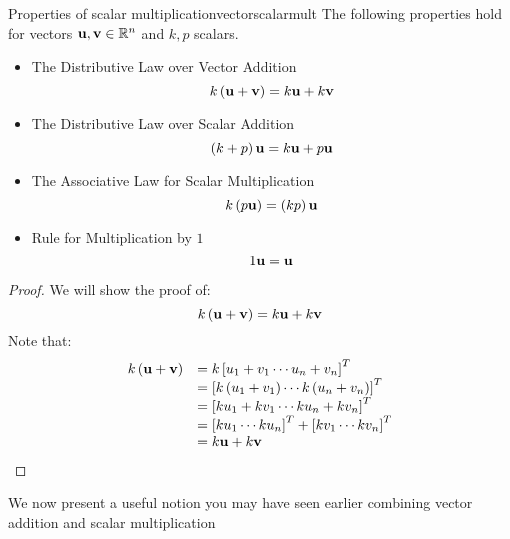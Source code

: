 \begin{theorem}{Properties of scalar multiplication}{vectorscalarmult}
The following properties hold for vectors ${\bf u},{\bf v}\in \mathbb{R}^{n}$ and $k,p $
scalars.
\begin{itemize}
\item The Distributive Law over Vector Addition
\begin{equation*}
k \left( {\bf u}+{\bf v}\right) = k{\bf u}+ k{\bf v}
\end{equation*}
\item The Distributive Law over Scalar Addition
\begin{equation*}
\left( k + p  \right){\bf u} = k {\bf u}+p {\bf u}
\end{equation*}
\item The Associative Law for Scalar Multiplication
\begin{equation*}
k \left( p {\bf u}\right) = \left(k p \right){\bf u}
\end{equation*}
\item Rule for Multiplication by $1$
\begin{equation*}
1{\bf u}={\bf u}  
\end{equation*}
\end{itemize}
\end{theorem}

\begin{proof}
We will show the proof of: 
\begin{equation*}
k \left( {\bf u}+{\bf v}\right) = k {\bf u}+ k {\bf v}
\end{equation*}
Note that:
\begin{equation*}
\begin{array}{ll}
k \left( {\bf u}+{\bf v}\right) & =k \left[ u_{1}+v_{1} \cdots u_{n}+v_{n}\right]^T \\
& = \left[ k \left( u_{1}+v_{1}\right) \cdots k \left( u_{n}+v_{n}\right) \right]^T \\
& = \left[ k u_{1}+ k  v_{1} \cdots k u_{n}+ k v_{n}\right]^T \\
& = \left[ k u_{1} \cdots k u_{n} \right]^T + \left[ k v_{1} \cdots k v_{n} \right]^T \\
& = k {\bf u}+k {\bf v} \\
\end{array}
\end{equation*}
\end{proof}

We now present a useful notion you may have seen earlier combining vector addition and scalar multiplication


